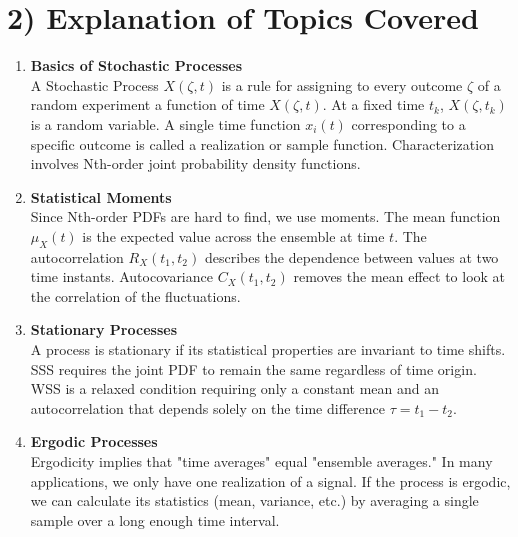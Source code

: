 \documentclass[11pt]{article}
\begin{document}
\section*{2) Explanation of Topics Covered}
\begin{enumerate}
    \item \textbf{Basics of Stochastic Processes} \\
    A Stochastic Process $X(\zeta, t)$ is a rule for assigning to every outcome $\zeta$ of a random experiment a function of time $X(\zeta, t)$. At a fixed time $t_k$, $X(\zeta, t_k)$ is a random variable. A single time function $x_i(t)$ corresponding to a specific outcome is called a realization or sample function. Characterization involves Nth-order joint probability density functions.

    \item \textbf{Statistical Moments} \\
    Since Nth-order PDFs are hard to find, we use moments. The mean function $\mu_X(t)$ is the expected value across the ensemble at time $t$. The autocorrelation $R_X(t_1, t_2)$ describes the dependence between values at two time instants. Autocovariance $C_X(t_1, t_2)$ removes the mean effect to look at the correlation of the fluctuations.

    \item \textbf{Stationary Processes} \\
    A process is stationary if its statistical properties are invariant to time shifts. SSS requires the joint PDF to remain the same regardless of time origin. WSS is a relaxed condition requiring only a constant mean and an autocorrelation that depends solely on the time difference $\tau = t_1 - t_2$.

    \item \textbf{Ergodic Processes} \\
    Ergodicity implies that "time averages" equal "ensemble averages." In many applications, we only have one realization of a signal. If the process is ergodic, we can calculate its statistics (mean, variance, etc.) by averaging a single sample over a long enough time interval.
\end{enumerate}
\end{document}
